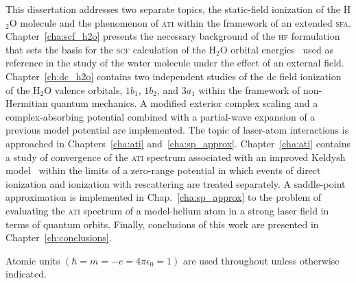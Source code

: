 
This dissertation addresses two separate topics, the static-field
ionization of the H$_{2}$O molecule and the phenomenon of \textsc{ati}
within the framework of an extended
\textsc{sfa}. Chapter~\ref{cha:scf_h2o} presents the necessary
background of the \textsc{hf} formulation that sets the basis for the
\textsc{scf} calculation of the H$_{2}$O orbital
energies~\cite{Moccia_1964} used as reference in the study of the
water molecule under the effect of an external
field. Chapter~\ref{ch:dc_h2o} contains two independent studies of the
dc field ionization of the H$_{2}$O valence orbitals, $1b_{1}$,
$1b_{2}$, and $3a_{1}$ within the framework of non-Hermitian quantum
mechanics. A modified exterior complex scaling and a complex-absorbing
potential combined with a partial-wave expansion of a previous model
potential are implemented. The topic of laser-atom interactions is
approached in Chapters~\ref{cha:ati}
and~\ref{cha:sp_approx}. Chapter~\ref{cha:ati} contains a study of
convergence of the \textsc{ati} spectrum associated with an improved
Keldysh model~\cite{Kopold_1997sfa} within the limits of a zero-range
potential in which events of direct ionization and ionization with
rescattering are treated separately. A saddle-point approximation is
implemented in Chap.~\ref{cha:sp_approx} to the problem of evaluating
the \textsc{ati} spectrum of a model-helium atom in a strong laser
field in terms of quantum orbits. Finally, conclusions of this work
are presented in Chapter~\ref{ch:conclusions}.

Atomic units $(\hbar = m = -e = 4\pi\epsilon_{0} = 1)$ are used
throughout unless otherwise indicated.

































